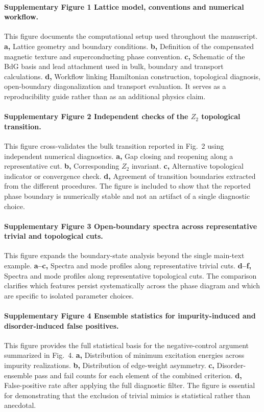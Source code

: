 \paragraph{Supplementary Figure 1 \textbar{} Lattice model, conventions and numerical workflow.}
This figure documents the computational setup used throughout the manuscript. \textbf{a,} Lattice geometry and boundary conditions. \textbf{b,} Definition of the compensated magnetic texture and superconducting phase convention. \textbf{c,} Schematic of the BdG basis and lead attachment used in bulk, boundary and transport calculations. \textbf{d,} Workflow linking Hamiltonian construction, topological diagnosis, open-boundary diagonalization and transport evaluation. It serves as a reproducibility guide rather than as an additional physics claim.

\paragraph{Supplementary Figure 2 \textbar{} Independent checks of the $Z_2$ topological transition.}
This figure cross-validates the bulk transition reported in Fig.~2 using independent numerical diagnostics. \textbf{a,} Gap closing and reopening along a representative cut. \textbf{b,} Corresponding $Z_2$ invariant. \textbf{c,} Alternative topological indicator or convergence check. \textbf{d,} Agreement of transition boundaries extracted from the different procedures. The figure is included to show that the reported phase boundary is numerically stable and not an artifact of a single diagnostic choice.

\paragraph{Supplementary Figure 3 \textbar{} Open-boundary spectra across representative trivial and topological cuts.}
This figure expands the boundary-state analysis beyond the single main-text example. \textbf{a--c,} Spectra and mode profiles along representative trivial cuts. \textbf{d--f,} Spectra and mode profiles along representative topological cuts. The comparison clarifies which features persist systematically across the phase diagram and which are specific to isolated parameter choices.

\paragraph{Supplementary Figure 4 \textbar{} Ensemble statistics for impurity-induced and disorder-induced false positives.}
This figure provides the full statistical basis for the negative-control argument summarized in Fig.~4. \textbf{a,} Distribution of minimum excitation energies across impurity realizations. \textbf{b,} Distribution of edge-weight asymmetry. \textbf{c,} Disorder-ensemble pass and fail counts for each element of the combined criterion. \textbf{d,} False-positive rate after applying the full diagnostic filter. The figure is essential for demonstrating that the exclusion of trivial mimics is statistical rather than anecdotal.

